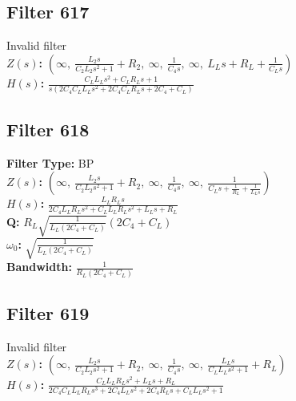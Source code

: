 \documentclass{article}
\begin{document}
\subsection*{Filter 617}
Invalid filter \\ 
\textbf{$Z(s)$:} $\left( \infty, \  \frac{L_{2} s}{C_{2} L_{2} s^{2} + 1} + R_{2}, \  \infty, \  \frac{1}{C_{4} s}, \  \infty, \  L_{L} s + R_{L} + \frac{1}{C_{L} s}\right)$ \\ 
\textbf{$H(s)$:} $\frac{C_{L} L_{L} s^{2} + C_{L} R_{L} s + 1}{s \left(2 C_{4} C_{L} L_{L} s^{2} + 2 C_{4} C_{L} R_{L} s + 2 C_{4} + C_{L}\right)}$ \\ 
\subsection*{Filter 618}
\textbf{Filter Type:} BP \\ 
\textbf{$Z(s)$:} $\left( \infty, \  \frac{L_{2} s}{C_{2} L_{2} s^{2} + 1} + R_{2}, \  \infty, \  \frac{1}{C_{4} s}, \  \infty, \  \frac{1}{C_{L} s + \frac{1}{R_{L}} + \frac{1}{L_{L} s}}\right)$ \\ 
\textbf{$H(s)$:} $\frac{L_{L} R_{L} s}{2 C_{4} L_{L} R_{L} s^{2} + C_{L} L_{L} R_{L} s^{2} + L_{L} s + R_{L}}$ \\ 
\textbf{Q:} $R_{L} \sqrt{\frac{1}{L_{L} \left(2 C_{4} + C_{L}\right)}} \left(2 C_{4} + C_{L}\right)$ \\ 
\textbf{$\omega_0$:} $\sqrt{\frac{1}{L_{L} \left(2 C_{4} + C_{L}\right)}}$ \\ 
\textbf{Bandwidth:} $\frac{1}{R_{L} \left(2 C_{4} + C_{L}\right)}$ \\ 
\subsection*{Filter 619}
Invalid filter \\ 
\textbf{$Z(s)$:} $\left( \infty, \  \frac{L_{2} s}{C_{2} L_{2} s^{2} + 1} + R_{2}, \  \infty, \  \frac{1}{C_{4} s}, \  \infty, \  \frac{L_{L} s}{C_{L} L_{L} s^{2} + 1} + R_{L}\right)$ \\ 
\textbf{$H(s)$:} $\frac{C_{L} L_{L} R_{L} s^{2} + L_{L} s + R_{L}}{2 C_{4} C_{L} L_{L} R_{L} s^{3} + 2 C_{4} L_{L} s^{2} + 2 C_{4} R_{L} s + C_{L} L_{L} s^{2} + 1}$ \\ 
\end{document}
